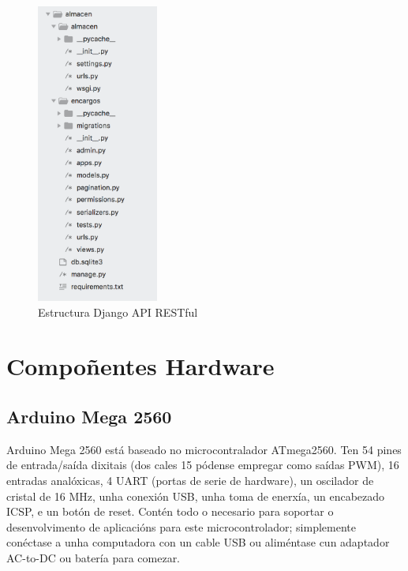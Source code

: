 \documentclass[11pt,twoside]{book}
\begin{document}
\begin{figure}[H]
	\begin{center}
		\includegraphics[width=4cm]{images/estructura_djangoREST.png}
	\end{center}
	\caption{Estructura Django API RESTful}
	\label{fig:EstructuraDjangoAPI}
\end{figure}


\chapter{Compoñentes Hardware}
\section{Arduino Mega 2560}

Arduino Mega 2560 está baseado no microcontralador ATmega2560. Ten 54 pines de entrada/saída dixitais (dos cales 15 pódense empregar como saídas PWM), 16 entradas analóxicas, 4 UART (portas de serie de hardware), un oscilador de cristal de 16 MHz, unha conexión USB, unha toma de enerxía, un encabezado ICSP, e un botón de reset. Contén todo o necesario para soportar o desenvolvimento de aplicacións para este microcontrolador; simplemente conéctase a unha computadora con un cable USB ou aliméntase cun adaptador AC-to-DC ou batería para comezar. 
\end{document}
